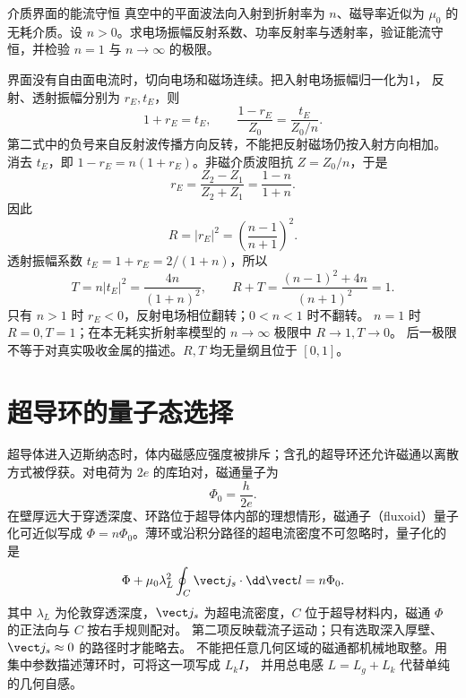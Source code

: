 \begin{origexamplebox}{介质界面的能流守恒}
真空中的平面波法向入射到折射率为 $n$、磁导率近似为 $\mu_0$ 的无耗介质。设 $n>0$。求电场振幅反射系数、功率反射率与透射率，验证能流守恒，并检验 $n=1$ 与 $n\to\infty$ 的极限。
\end{origexamplebox}
\begin{xesolution}
界面没有自由面电流时，切向电场和磁场连续。把入射电场振幅归一化为1，
反射、透射振幅分别为 $r_E,t_E$，则
\[
 1+r_E=t_E,\qquad \frac{1-r_E}{Z_0}=\frac{t_E}{Z_0/n}.
\]
第二式中的负号来自反射波传播方向反转，不能把反射磁场仍按入射方向相加。
消去 $t_E$，即 $1-r_E=n(1+r_E)$。非磁介质波阻抗 $Z=Z_0/n$，于是
\[
 r_E=\frac{Z_2-Z_1}{Z_2+Z_1}
 =\frac{1-n}{1+n}.
\]
因此
\[
 \boxed{R=|r_E|^2=\left(\frac{n-1}{n+1}\right)^2}.
\]
透射振幅系数 $t_E=1+r_E=2/(1+n)$，所以
\[
 T=n|t_E|^2=\frac{4n}{(1+n)^2},\qquad
 R+T=\frac{(n-1)^2+4n}{(n+1)^2}=1.
\]
只有 $n>1$ 时 $r_E<0$，反射电场相位翻转；$0<n<1$ 时不翻转。
$n=1$ 时 $R=0,T=1$；在本无耗实折射率模型的 $n\to\infty$ 极限中 $R\to1,T\to0$。
后一极限不等于对真实吸收金属的描述。$R,T$ 均无量纲且位于 $[0,1]$。
\end{xesolution}

\section{超导环的量子态选择}

超导体进入迈斯纳态时，体内磁感应强度被排斥；含孔的超导环还允许磁通以离散方式被俘获。对电荷为 $2e$ 的库珀对，磁通量子为
\begin{equation}
 \Phi_0=\frac{h}{2e}.
\end{equation}
在壁厚远大于穿透深度、环路位于超导体内部的理想情形，磁通子（fluxoid）量子化可近似写成
$\Phi=n\Phi_0$。薄环或沿积分路径的超电流密度不可忽略时，量子化的是
\begin{equation}
 \Phi+\mu_0\lambda_L^2\oint_C\vect j_s\cdot\dd\vect l=n\Phi_0.
\end{equation}
其中 $\lambda_L$ 为伦敦穿透深度，$\vect j_s$ 为超电流密度，$C$ 位于超导材料内，磁通 $\Phi$ 的正法向与 $C$ 按右手规则配对。
第二项反映载流子运动；只有选取深入厚壁、$\vect j_s\approx0$ 的路径时才能略去。
不能把任意几何区域的磁通都机械地取整。用集中参数描述薄环时，可将这一项写成 $L_kI$，
并用总电感 $L=L_g+L_k$ 代替单纯的几何自感。

